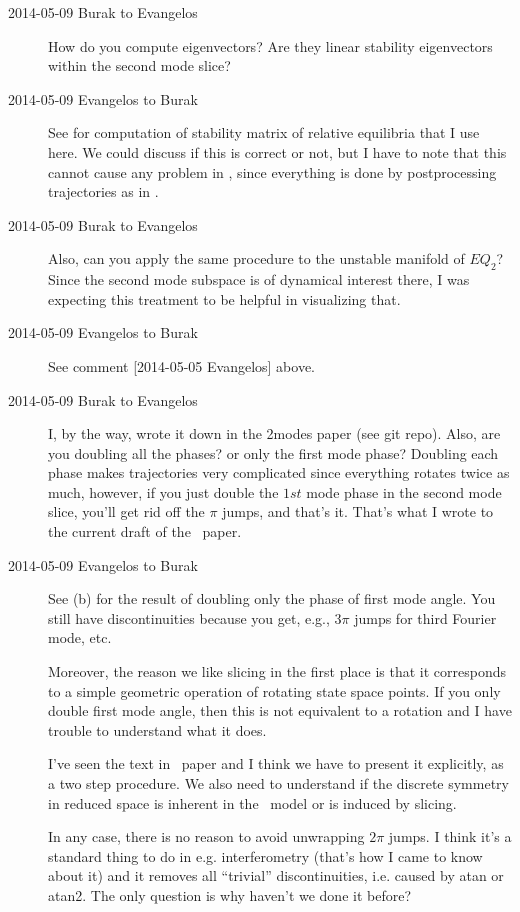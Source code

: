 \begin{description}
\item[2014-05-09 Burak to Evangelos] How do you compute eigenvectors? Are they linear stability
eigenvectors within the second mode slice?

\item[2014-05-09 Evangelos to Burak]
See  for computation of stability matrix of relative equilibria that I use here.
We could discuss if this is correct or not, but I have to note that this cannot cause any
problem in , since everything is done by postprocessing
trajectories as in .

\item[2014-05-09 Burak to Evangelos] Also, can you apply the same procedure to the
unstable manifold of $EQ_2$? Since the second mode subspace is of dynamical interest there,
I was expecting this treatment to be helpful in visualizing that.

\item[2014-05-09 Evangelos to Burak] See comment [2014-05-05 Evangelos] above.

\item[2014-05-09 Burak to Evangelos] I, by the way, wrote it down in the 2modes paper (see git repo).
Also, are you doubling all the phases? or only the first mode phase?
Doubling each phase makes trajectories very complicated since everything rotates twice as much, however,
if you just double the $1st$ mode phase in the second mode slice, you'll get rid off the $\pi$ jumps,
and that's it. That's what I wrote to the current draft of the \twoMode\ paper.

\item[2014-05-09 Evangelos to Burak] See (b) for the result of
doubling only the phase of first mode angle. You still have discontinuities because you get, e.g.,
$3\pi$ jumps for third Fourier mode, etc.

Moreover, the reason we like slicing in the first place is that it corresponds to a simple geometric operation
of rotating state space points. If you only double first mode angle, then this is not equivalent to
a rotation and I have trouble to understand what it does.

I've seen the text in \twoMode\ paper and I think we have to present it explicitly,
as a two step procedure. We also need to understand if the discrete symmetry in reduced space is
inherent in the \twoMode\ model or is induced by slicing.

In any case, there is no reason to avoid unwrapping $2\pi$ jumps. I think it's a standard thing to do
in e.g. interferometry (that's how I came to know about it) and it removes all ``trivial'' discontinuities,
i.e. caused by atan or atan2. The only question is why haven't we done it before?


\end{description}
